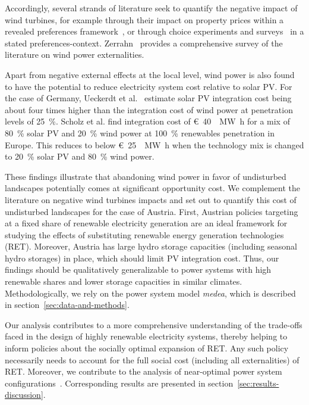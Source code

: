 \documentclass[review, 3p, times, 12pt]{elsarticle} %
\begin{document}
Accordingly, several strands of literature seek to quantify the negative impact of wind turbines, for example
through their impact on property prices within a revealed preferences framework~\citep{Droees2016, Gibbons2015,
Heintzelmann2017, Jensen2018, Kussel2019, Lang2014, Sims2008, Sunak2016, Vyn2014}, or through choice
experiments and surveys~\citep{Drechsler2011, Mattmann2016, Meyerhoff2010} in a stated preferences-context.
Zerrahn~\cite{Zerrahn2017} provides a comprehensive survey of the literature on wind power externalities.

Apart from negative external effects at the local level, wind power is also found to have the potential to reduce
electricity system cost relative to solar PV.
For the case of Germany, Ueckerdt et al.~\cite{Ueckerdt2013} estimate solar PV integration cost being about four times higher than the integration cost of wind power at penetration levels of \SI{25}{\percent}.
Scholz et al. find \cite{Scholz2017} integration cost of \SI{40}[\euro]{\per \mega\watt\hour} for a mix of \SI{80}{\percent} solar PV and \SI{20}{\percent} wind power at \SI{100}{\percent} renewables penetration in Europe.
This reduces to below \SI{25}[\euro]{\per\mega\watt\hour} when the technology mix is changed to \SI{20}{\percent} solar PV and \SI{80}{\percent} wind power.

These findings illustrate that abandoning wind power in favor of undisturbed landscapes potentially comes at significant opportunity cost.
We complement the literature on negative wind turbines impacts and set out to quantify this cost of undisturbed landscapes for the case of Austria.
First, Austrian policies targeting at a fixed share of renewable electricity generation are an ideal framework for
studying the effects of substituting renewable energy generation technologies (RET).
Moreover, Austria has large hydro storage capacities (including seasonal hydro storages) in place, which should limit PV integration cost.
Thus, our findings should be qualitatively generalizable to power systems with high renewable shares and lower storage capacities in similar climates.
Methodologically, we rely on the power system model \emph{medea}, which is described in section~\ref{sec:data-and-methods}.

Our analysis contributes to a more comprehensive understanding of the trade-offs faced in the design of highly renewable electricity systems, thereby helping to inform policies about the socially optimal expansion of RET.
Any such policy necessarily needs to account for the full social cost (including all externalities) of RET.
Moreover, we contribute to the analysis of near-optimal power system configurations~\citep[see e.g.][]{Neumann2019,
Schlachtberger2017}.
Corresponding results are presented in section~\ref{sec:results-discussion}.
\end{document}
